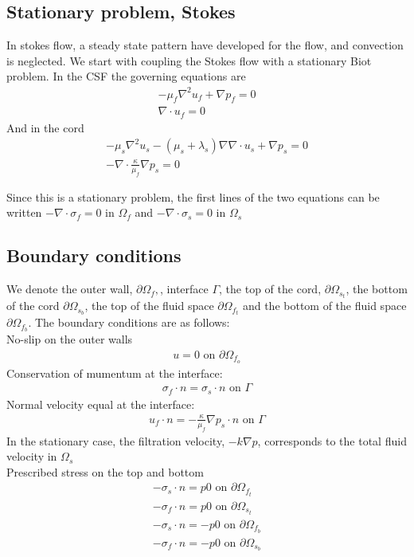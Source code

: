 \subsection{Stationary problem, Stokes}
In stokes flow, a steady state pattern have developed for the flow, and convection is neglected. We start with coupling the Stokes flow with a stationary Biot problem. In the CSF the governing equations are
\begin{align}
	- \mu_f \nabla ^2 u_f
	+ \nabla p_f
	= 0 \nonumber \\
	\nabla \cdot u_f = 0
\end{align}
And in the cord
\begin{align}
	- \mu_s \nabla^2 u_s 
	- (\mu_s + \lambda_s) \nabla \nabla \cdot u_s
	+ \nabla p_s = 0 \nonumber \\ 
	- \nabla \cdot \frac{\kappa}{\mu_f} \nabla p_s = 0
\end{align}

Since this is a stationary problem, the first lines of the two equations can be written $-\nabla \cdot \sigma_f = 0$ in $\Omega_f$ and $-\nabla \cdot \sigma_s = 0$ in $\Omega_s$ 




\subsection*{Boundary conditions}
We denote the outer wall, $\partial \Omega_f,$, interface $\Gamma$, the top of the cord, $\partial \Omega_{s_t}$, the bottom of the cord $\partial \Omega_{s_b}$, the top of the fluid space $\partial \Omega_{f_t}$ and the bottom of the fluid space $\partial \Omega_{f_b}$. The boundary conditions are as follows: \\
No-slip on the outer walls
\begin{align} u = 0 \text{ on } \partial \Omega_{f_o} \end{align}
Conservation of mumentum at the interface:
\begin{align} \sigma_f \cdot n = \sigma_s \cdot n \text{ on } \Gamma \end{align}
Normal velocity equal at the interface:
\begin{align} u_f \cdot n = - \frac{\kappa}{\mu_f} \nabla p_s \cdot n  \text{ on } \Gamma \end{align}
In the stationary case, the filtration velocity, $-k\nabla p $, corresponds to the total fluid velocity in $\Omega_s$ \\
Prescribed stress on the top and bottom
\begin{align} -\sigma_s \cdot n = p0 \text{ on } \partial \Omega_{f_t} \nonumber \\
			  -\sigma_f \cdot n = p0 \text{ on } \partial \Omega_{s_t} \\
			  -\sigma_s \cdot n = -p0 \text{ on } \partial \Omega_{f_b} \nonumber \\
			  -\sigma_f \cdot n = -p0 \text{ on } \partial \Omega_{s_b} \nonumber
\end{align}



